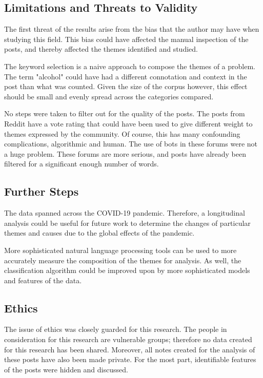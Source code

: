 \documentclass[../report.tex]{subfiles}
\begin{document}
\subsection{Limitations and Threats to Validity}

The first threat of the results arise from the bias that the author may have when studying this field. 
This bias could have affected the manual inspection of the posts, and thereby affected the themes identified and studied. 

The keyword selection is a naive approach to compose the themes of a problem.
The term "alcohol" could have had a different connotation and context in the post than what was counted.
Given the size of the corpus however, this effect should be small and evenly spread across the categories compared.

No steps were taken to filter out for the quality of the posts. 
The posts from Reddit have a vote rating that could have been used to give different weight to themes expressed by the community.
Of course, this has many confounding complications, algorithmic and human.
The use of bots in these forums were not a huge problem. 
These forums are more serious, and posts have already been filtered for a significant enough number of words.

\subsection{Further Steps}
The data spanned across the COVID-19 pandemic. 
Therefore, a longitudinal analysis could be useful for future work to determine the changes of particular themes and causes due to the global effects of the pandemic.

More sophisticated natural language processing tools can be used to more accurately measure the composition of the themes for analysis. 
As well, the classification algorithm could be improved upon by more sophisticated models and features of the data. 

\subsection{Ethics}
The issue of ethics was closely guarded for this research.
The people in consideration for this research are vulnerable groups; therefore no data created for this research has been shared. 
Moreover, all notes created for the analysis of these posts have also been made private. 
For the most part, identifiable features of the posts were hidden and discussed.
\end{document}
